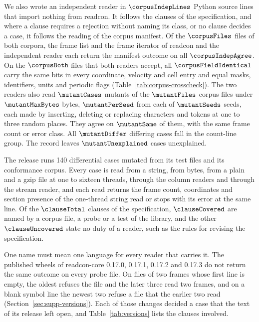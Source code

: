 \documentclass[preprint,12pt]{elsarticle}
\begin{document}
We also wrote an independent reader in \(\corpusIndepLines\) Python
source lines that import nothing from readcon.
It follows the clauses of the specification, and where a clause requires
a rejection without naming its class, or no clause decides a case, it
follows the reading of the corpus manifest.
Of the \(\corpusFiles\) files of both corpora, the frame list and the
frame iterator of readcon and the independent reader each return the
manifest outcome on all \(\corpusIndepAgree\).
On the \(\corpusBoth\) files that both readers accept, all
\(\corpusFieldIdentical\) carry the same bits in every coordinate,
velocity and cell entry and equal masks, identifiers, units and periodic
flags (Table~\ref*{tab:corpus-crosscheck}).
The two readers also read \(\mutantCases\) mutants of the
\(\mutantFiles\) corpus files under \(\mutantMaxBytes\) bytes,
\(\mutantPerSeed\) from each of \(\mutantSeeds\) seeds, each made by
inserting, deleting or replacing characters and tokens at one to three
random places.
They agree on \(\mutantSame\) of them, with the same frame count or
error class.
All \(\mutantDiffer\) differing cases fall in the count-line group.
The record leaves \(\mutantUnexplained\) cases unexplained.

The release runs 140 differential cases mutated from its test files and
its conformance corpus.
Every case is read from a string, from bytes, from a plain and a gzip
file at one to sixteen threads, through the column readers and through
the stream reader, and each read returns the frame count, coordinates
and section presence of the one-thread string read or stops with its
error at the same line.
Of the \(\clauseTotal\) clauses of the specification, \(\clauseCovered\)
are named by a corpus file, a probe or a test of the library, and the
other \(\clauseUncovered\) state no duty of a reader, such as the rules
for revising the specification.

One name must mean one language for every reader that carries it.
The published wheels of readcon-core 0.17.0, 0.17.1, 0.17.2 and 0.17.3
do not return the same outcome on every probe file.
On files of two frames whose first line is empty, the oldest refuses the
file and the later three read two frames, and on a blank symbol line the
newest two refuse a file that the earlier two read
(Section~\ref*{sec:supp-versions}).
Each of those changes decided a case that the text of its release left
open, and Table~\ref{tab:versions} lists the clauses involved.
\end{document}
